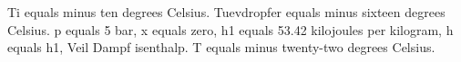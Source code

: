 Ti equals minus ten degrees Celsius. Tuevdropfer equals minus sixteen degrees Celsius. p equals 5 bar, x equals zero, h1 equals 53.42 kilojoules per kilogram, h equals h1, Veil Dampf isenthalp. T equals minus twenty-two degrees Celsius.